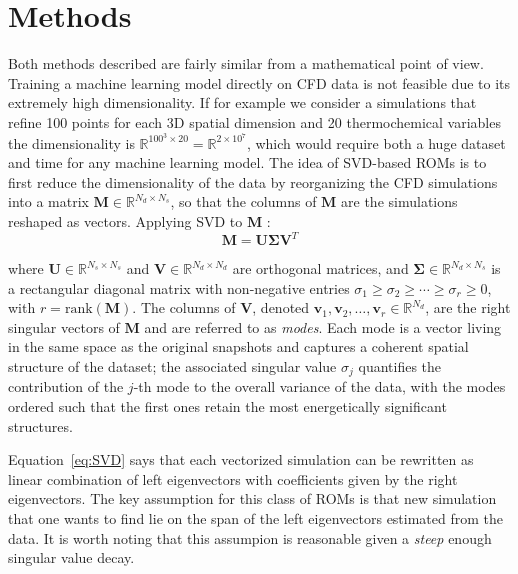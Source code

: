 \section{Methods}

Both methods described are fairly similar from a mathematical point of view. Training a machine learning model directly on CFD data is not feasible due to its extremely high dimensionality. If for example we consider a simulations that refine 100 points for each 3D spatial dimension and 20 thermochemical variables the dimensionality is $\mathbb{R}^{100^3 \times 20} = \mathbb{R}^{2 \times 10^7}$, which would require both a huge dataset and time for any machine learning model.
The idea of SVD-based ROMs is to first reduce the dimensionality of the data by reorganizing the CFD simulations into a matrix $\mathbf{M} \in \mathbb{R}^{N_d \times N_s}$, so that the columns of $\mathbf{M}$ are the simulations reshaped as vectors.
Applying SVD to $\mathbf{M}$ :
\begin{equation}\label{eq:SVD}
    \mathbf{M} = \mathbf{U} \boldsymbol{\Sigma} \mathbf{V}^T
\end{equation}

where $\mathbf{U} \in \mathbb{R}^{N_s \times N_s}$ and $\mathbf{V} \in \mathbb{R}^{N_d \times N_d}$ are orthogonal matrices, and $\boldsymbol{\Sigma} \in \mathbb{R}^{N_d \times N_s}$ is a rectangular diagonal matrix with non-negative entries $\sigma_1 \geq \sigma_2 \geq \cdots \geq \sigma_r \geq 0$, 
with $r = \text{rank}(\mathbf{M})$. The columns of $\mathbf{V}$, denoted $\mathbf{v}_1, \mathbf{v}_2, \ldots, \mathbf{v}_r \in \mathbb{R}^{N_d}$, are the right singular vectors of $\mathbf{M}$ and are  referred to as \textit{modes}. Each mode is a vector living in the same space as the original 
snapshots and captures a coherent spatial structure of the dataset; the associated singular value  $\sigma_j$ quantifies the contribution of the $j$-th mode to the overall variance of the data,  with the modes ordered such that the first ones retain the most energetically significant structures.

Equation~\ref{eq:SVD} says that each vectorized simulation can be rewritten as linear combination of left eigenvectors with coefficients given by the right eigenvectors. The key assumption for this class of ROMs is that new simulation that one wants to find lie on the span of the left eigenvectors estimated from the data. It is worth noting that this assumpion is reasonable given a \textit{steep} enough singular value decay.  


